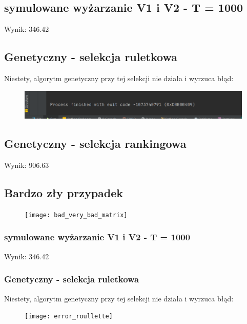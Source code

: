 \documentclass{article}
\begin{document}
\subsection{symulowane wyżarzanie V1 i V2  - T = 1000}
Wynik: 346.42

\subsection{Genetyczny - selekcja ruletkowa}
Niestety, algorytm genetyczny przy tej selekcji nie działa i wyrzuca błąd:

\begin{figure}[H]
	\centering
	\includegraphics[width=0.7\linewidth]{screens/error_roullette}
	\caption{}
	\label{fig:errorroullette}
\end{figure}


\subsection{Genetyczny - selekcja rankingowa}
Wynik: 906.63

\subsection{Bardzo zły przypadek}

\begin{figure}[H]
	\centering
	\texttt{[image: bad\_very\_bad\_matrix]}
	\caption{}
	\label{fig:badverybadmatrix}
\end{figure}

\subsubsection{symulowane wyżarzanie V1 i V2  - T = 1000}
Wynik: 346.42

\subsubsection{Genetyczny - selekcja ruletkowa}
Niestety, algorytm genetyczny przy tej selekcji nie działa i wyrzuca błąd:

\begin{figure}[H]
	\centering
	\texttt{[image: error\_roullette]}
	\caption{}
	\label{fig:errorroullette}
\end{figure}
\end{document}
